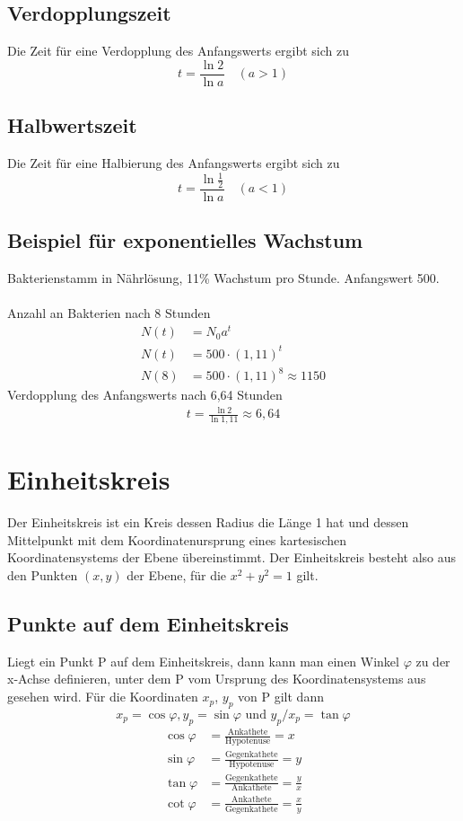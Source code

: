 \documentclass[a4paper]{article}
\begin{document}
\subsection{Verdopplungszeit}
Die Zeit für eine Verdopplung des Anfangswerts ergibt sich zu
\[ t = \frac{\ln 2}{\ln a} \quad (a>1) \]

\subsection{Halbwertszeit}
Die Zeit für eine Halbierung des Anfangswerts ergibt sich zu
\[ t = \frac{\ln \frac{1}{2}}{\ln a}  \quad (a<1) \]

\subsection{Beispiel für exponentielles Wachstum}
Bakterienstamm in Nährlösung, 11\% Wachstum pro Stunde. Anfangswert 500.
\\\\
Anzahl an Bakterien nach 8 Stunden
\begin{align*}
N(t)&=N_0a^t \\
N(t)&=500 \cdot (1,11)^t \\
N(8)&=500 \cdot (1,11)^8 \approx 1150
\end{align*}
Verdopplung des Anfangswerts nach 6,64 Stunden
\begin{align*}
t= \frac{\ln 2}{\ln {1,11} } \approx 6,64
\end{align*}

\section{Einheitskreis}
Der Einheitskreis ist ein Kreis dessen Radius die Länge 1 hat und dessen Mittelpunkt mit dem Koordinatenursprung eines kartesischen Koordinatensystems der Ebene übereinstimmt. Der Einheitskreis besteht also aus den Punkten $(x,y)$ der Ebene, für die $x^2 + y^2 = 1$ gilt.
\subsection{Punkte auf dem Einheitskreis}
Liegt ein Punkt P auf dem Einheitskreis, dann kann man einen Winkel $\varphi$ zu der x-Achse definieren, unter dem P vom Ursprung des Koordinatensystems aus gesehen wird. Für die Koordinaten $x_p$, $y_p$ von P gilt dann
\[ x_p = \cos \varphi, y_p = \sin \varphi \text{ und } y_p/x_p = \tan \varphi \]
\begin{align*}
\cos \varphi &= \frac{\text{Ankathete}}{\text{Hypotenuse}} = x \\
\sin \varphi &= \frac{\text{Gegenkathete}}{\text{Hypotenuse}} = y \\
\tan \varphi &= \frac{\text{Gegenkathete}}{\text{Ankathete}} = \frac{y}{x} \\
\cot \varphi &= \frac{\text{Ankathete}}{\text{Gegenkathete}} = \frac{x}{y}
\end{align*}
\end{document}
